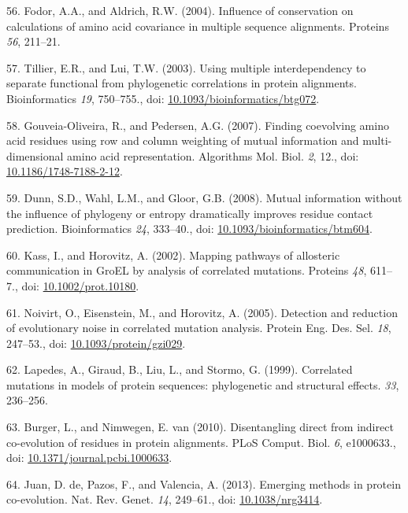 \documentclass[11pt,a4paper,twoside]{book}
\theoremstyle{definition}
\theoremstyle{definition}
\theoremstyle{remark}
\begin{document}
\hypertarget{ref-Fodor2004}{}
56. Fodor, A.A., and Aldrich, R.W. (2004). Influence of conservation on
calculations of amino acid covariance in multiple sequence alignments.
Proteins \emph{56}, 211--21.

\hypertarget{ref-Tillier2003}{}
57. Tillier, E.R., and Lui, T.W. (2003). Using multiple interdependency
to separate functional from phylogenetic correlations in protein
alignments. Bioinformatics \emph{19}, 750--755., doi:
\href{https://doi.org/10.1093/bioinformatics/btg072}{10.1093/bioinformatics/btg072}.

\hypertarget{ref-Gouveia_Oliveira2007}{}
58. Gouveia-Oliveira, R., and Pedersen, A.G. (2007). Finding coevolving
amino acid residues using row and column weighting of mutual information
and multi-dimensional amino acid representation. Algorithms Mol. Biol.
\emph{2}, 12., doi:
\href{https://doi.org/10.1186/1748-7188-2-12}{10.1186/1748-7188-2-12}.

\hypertarget{ref-Dunn2008}{}
59. Dunn, S.D., Wahl, L.M., and Gloor, G.B. (2008). Mutual information
without the influence of phylogeny or entropy dramatically improves
residue contact prediction. Bioinformatics \emph{24}, 333--40., doi:
\href{https://doi.org/10.1093/bioinformatics/btm604}{10.1093/bioinformatics/btm604}.

\hypertarget{ref-Kass2002}{}
60. Kass, I., and Horovitz, A. (2002). Mapping pathways of allosteric
communication in GroEL by analysis of correlated mutations. Proteins
\emph{48}, 611--7., doi:
\href{https://doi.org/10.1002/prot.10180}{10.1002/prot.10180}.

\hypertarget{ref-Noivirt2005}{}
61. Noivirt, O., Eisenstein, M., and Horovitz, A. (2005). Detection and
reduction of evolutionary noise in correlated mutation analysis. Protein
Eng. Des. Sel. \emph{18}, 247--53., doi:
\href{https://doi.org/10.1093/protein/gzi029}{10.1093/protein/gzi029}.

\hypertarget{ref-Lapedes1999}{}
62. Lapedes, A., Giraud, B., Liu, L., and Stormo, G. (1999). Correlated
mutations in models of protein sequences: phylogenetic and structural
effects. \emph{33}, 236--256.

\hypertarget{ref-Burger2010}{}
63. Burger, L., and Nimwegen, E. van (2010). Disentangling direct from
indirect co-evolution of residues in protein alignments. PLoS Comput.
Biol. \emph{6}, e1000633., doi:
\href{https://doi.org/10.1371/journal.pcbi.1000633}{10.1371/journal.pcbi.1000633}.

\hypertarget{ref-DeJuan2013}{}
64. Juan, D. de, Pazos, F., and Valencia, A. (2013). Emerging methods in
protein co-evolution. Nat. Rev. Genet. \emph{14}, 249--61., doi:
\href{https://doi.org/10.1038/nrg3414}{10.1038/nrg3414}.
\end{document}
